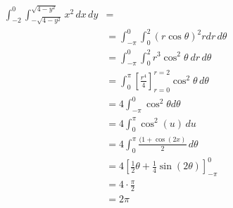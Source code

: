 \documentclass[letter,11pt]{article}
\begin{document}
\begin{align*}
	\int_{-2}^{0}\int_{-\sqrt{4-y^2}}^{\sqrt{4-y^2}} x^2 \,dx\,dy & =                                                                                \\
	                                                              & = \int_{-\pi}^{0}\int_{0}^{2}\left(r\cos\theta\right)^{2}r dr\,d\theta           \\
	                                                              & = \int_{-\pi}^{0}\int_{0}^{2}r^{3}\cos^{2}\theta\ dr\, d\theta                   \\
	                                                              & = \int_{0}^{\pi} \left[\frac{r^4}{4}\right]_{r=0}^{r=2}\cos^{2}\theta \, d\theta \\
	                                                              & = 4\int_{-\pi}^{0}\cos^{2}\theta d\theta                                         \\
	                                                              & = 4\int_{0}^{\pi} \cos^2(u) \, du                                                \\
	                                                              & = 4\int_{0}^{\pi} \frac{(1+\cos(2x)}{2} \, d\theta                               \\
	                                                              & = 4\left[\frac{1}{2}\theta + \frac{1}{4}\sin(2\theta)\right]_{-\pi}^{0}          \\
	                                                              & = 4 \cdot \frac{\pi}{2}                                                          \\
	                                                              & = \boxed{2\pi}                                                                   
\end{align*}
\newpage
\end{document}
